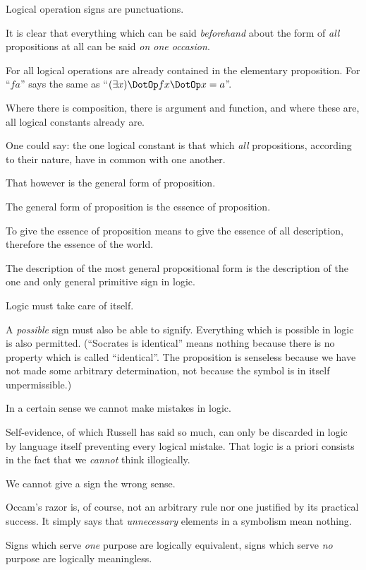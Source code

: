 {Logical operation signs are punctuations.}


{It is clear that everything which can be said
\emph{beforehand} about the form of \emph{all} propositions at
all can be said \emph{on one occasion}.

For all logical operations are already contained
in the elementary proposition. For ``$fa$'' says
the same as ``$(\exists x) \DotOp fx \DotOp x = a$''.

Where there is composition, there is argument
and function, and where these are, all logical
constants already are.

One could say: the one logical constant is that
which \emph{all} propositions, according to their nature,
have in common with one another.

That however is the general form of proposition.}


{The general form of proposition is the essence
of proposition.}


{To give the essence of proposition means to
give the essence of all description, therefore the
essence of the world.}


{The description of the most general propositional
form is the description of the one and only
general primitive sign in logic.}


{Logic must take care of itself.

A \emph{possible} sign must also be able to signify.
Everything which is possible in logic is also
permitted. (``Socrates is identical'' means nothing
because there is no property which is called
``identical''. The proposition is senseless because
we have not made some arbitrary determination,
not because the symbol is in itself unpermissible.)

In a certain sense we cannot make mistakes in
logic.}


{Self-evidence, of which Russell has said so
much, can only be discarded in logic by language
itself preventing every logical mistake. That
logic is a priori consists in the fact that we \emph{cannot}
think illogically.}


{We cannot give a sign the wrong sense.}


{Occam's razor is, of course, not an arbitrary rule
nor one justified by its practical success. It simply
says that \emph{unnecessary} elements in a symbolism
mean nothing.

Signs which serve \emph{one} purpose are logically
equivalent, signs which serve \emph{no} purpose are
logically meaningless.}


